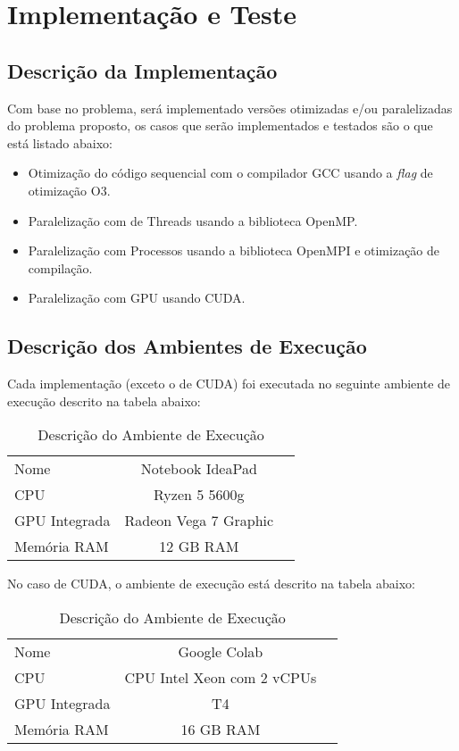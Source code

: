 \section{Implementação e Teste}

\subsection{Descrição da Implementação}

Com base no problema, será implementado versões otimizadas e/ou paralelizadas do problema proposto, os casos que serão implementados e testados são o que está listado abaixo:

\begin{itemize}
    \item Otimização do código sequencial com o compilador GCC usando a \textit{flag} de otimização O3.
    \item Paralelização com de Threads usando a biblioteca OpenMP.
    \item Paralelização com Processos usando a biblioteca OpenMPI e otimização de compilação.
    \item Paralelização com GPU usando CUDA.
\end{itemize}

\subsection{Descrição dos Ambientes de Execução}

Cada implementação (exceto o de CUDA) foi executada no seguinte ambiente de execução descrito na tabela abaixo:

\begin{table}[H]
    \centering
    \caption{Descrição do Ambiente de Execução}
    \label{tab:exemplo}
    \begin{tabular}{lcc}
        \toprule
        Nome          & Notebook IdeaPad      \\
        CPU           & Ryzen 5 5600g         \\
        GPU Integrada & Radeon Vega 7 Graphic \\
        Memória RAM   & 12 GB RAM             \\
        \bottomrule
    \end{tabular}
\end{table}

No caso de CUDA, o ambiente de execução está descrito na tabela abaixo:

\begin{table}[H]
    \centering
    \caption{Descrição do Ambiente de Execução}
    \label{tab:exemplo}
    \begin{tabular}{lcc}
        \toprule
        Nome          & Google Colab               \\
        CPU           & CPU Intel Xeon com 2 vCPUs \\
        GPU Integrada & T4                         \\
        Memória RAM   & 16 GB RAM                  \\
        \bottomrule
    \end{tabular}
\end{table}

